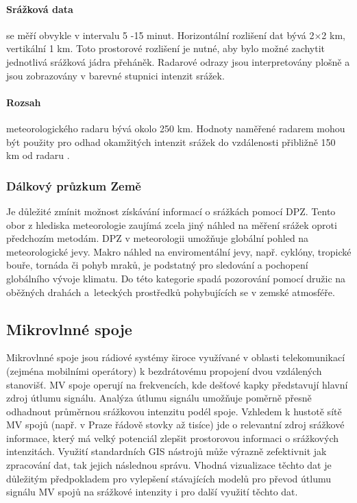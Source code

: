 \documentclass[a4paper,12pt,oneside]{report}
\begin{document}
\paragraph*{Srážková data} se měří obvykle v intervalu 5 -15
minut. Horizontální rozlišení dat bývá 2×2 km, vertikální 1 km. Toto
prostorové rozlišení je nutné, aby bylo možné zachytit jednotlivá
srážková jádra přeháněk. Radarové odrazy jsou interpretovány plošně a
jsou zobrazovány v barevné stupnici intenzit srážek.

\paragraph*{Rozsah} meteorologického radaru bývá okolo 250 km. Hodnoty
naměřené radarem mohou být použity pro odhad okamžitých intenzit
srážek do vzdálenosti přibližně 150 km od radaru \cite{kohout}.

\subsubsection{Dálkový průzkum Země}
Je důležité zmínit možnost získávání informací o srážkách pomocí
  \acs{DPZ}. Tento obor z hlediska meteorologie zaujímá zcela jiný
náhled na měření srážek oproti předchozím metodám. \acs{DPZ} v
meteorologii umožňuje globální pohled na meteorologické jevy. Makro
náhled na enviromentální jevy, např. cyklóny, tropické bouře, tornáda
či pohyb mraků, je podstatný pro sledování a pochopení globálního
vývoje klimatu. Do této kategorie spadá pozorování pomocí družic na
oběžných drahách a~leteckých prostředků pohybujících se v zemské
atmosféře.


\subsection{Mikrovlnné spoje}

Mikrovlnné spoje jsou rádiové systémy široce využívané v oblasti
telekomunikací (zejména mobilními operátory) k bezdrátovému propojení
dvou vzdálených stanovišť. MV spoje operují na frekvencích, kde
dešťové kapky představují hlavní zdroj útlumu signálu. Analýza útlumu
signálu umožňuje poměrně přesně odhadnout průměrnou srážkovou
intenzitu podél spoje. Vzhledem k hustotě sítě MV spojů (např. v Praze
řádově stovky až tisíce) jde o relevantní zdroj srážkové informace,
který má velký potenciál zlepšit prostorovou informaci o srážkových
intenzitách. Využití standardních GIS nástrojů může výrazně
zefektivnit jak zpracování dat, tak jejich následnou správu.  Vhodná
vizualizace těchto dat je důležitým předpokladem pro vylepšení
stávajících modelů pro převod útlumu signálu MV spojů na srážkové
intenzity i pro další využití těchto dat.
\end{document}
